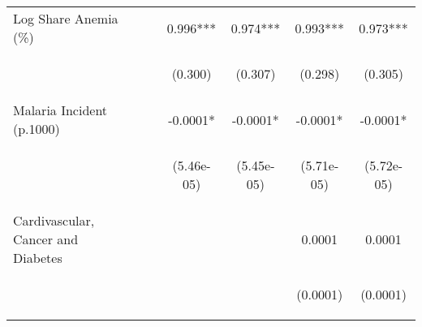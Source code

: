 \documentclass{article}
\begin{document}
\begin{table}[htbp]
{\begin{tabular}{lcccccc}
Log Share Anemia (\%)&  &  & 0.996*** & 0.974*** & 0.993*** & 0.973*** \\
\vspace{4pt} & \begin{footnotesize}\end{footnotesize} & \begin{footnotesize}\end{footnotesize} & \begin{footnotesize}(0.300)\end{footnotesize} & \begin{footnotesize}(0.307)\end{footnotesize} & \begin{footnotesize}(0.298)\end{footnotesize} & \begin{footnotesize}(0.305)\end{footnotesize} \\
Malaria Incident (p.1000) &  &  & -0.0001* & -0.0001* & -0.0001* & -0.0001* \\
\vspace{4pt} & \begin{footnotesize}\end{footnotesize} & \begin{footnotesize}\end{footnotesize} & \begin{footnotesize}(5.46e-05)\end{footnotesize} & \begin{footnotesize}(5.45e-05)\end{footnotesize} & \begin{footnotesize}(5.71e-05)\end{footnotesize} & \begin{footnotesize}(5.72e-05)\end{footnotesize} \\
Cardivascular, Cancer and Diabetes &  &  &  &  & 0.0001 & 0.0001 \\
\vspace{4pt} & \begin{footnotesize}\end{footnotesize} & \begin{footnotesize}\end{footnotesize} & \begin{footnotesize}\end{footnotesize} & \begin{footnotesize}\end{footnotesize} & \begin{footnotesize}(0.0001)\end{footnotesize} & \begin{footnotesize}(0.0001)\end{footnotesize} \\

\end{tabular}}
\end{table}
\end{document}
